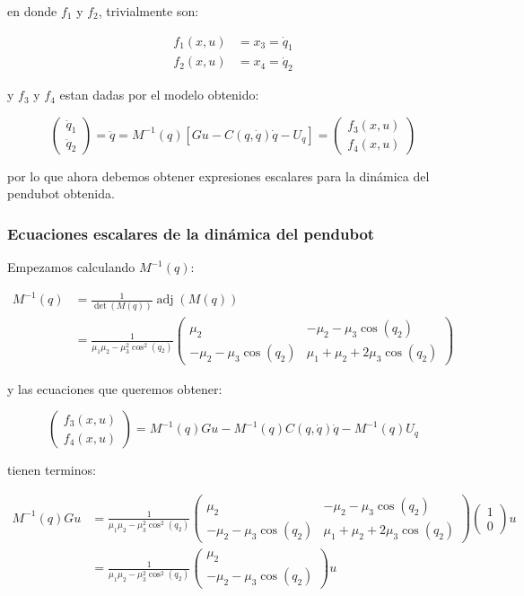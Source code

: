 \documentclass{article}
\DeclareMathOperator{\adjunta}{adj}
\begin{document}
en donde \(f_1\) y \(f_2\), trivialmente son:

\[
\begin{align}
f_1(x, u) &= x_3 = \dot{q}_1 \\
f_2(x, u) &= x_4 = \dot{q}_2
\end{align}
\]

y \(f_3\) y \(f_4\) estan dadas por el modelo obtenido:

\[
\begin{pmatrix}
\ddot{q}_1 \\
\ddot{q}_2
\end{pmatrix} = \ddot{q} = M^{-1}(q) \left[ G u - C(q, \dot{q}) \dot{q} - U_q \right] =
\begin{pmatrix}
f_3(x, u) \\
f_4(x, u)
\end{pmatrix}
\]

por lo que ahora debemos obtener expresiones escalares para la dinámica
del pendubot obtenida.

    \subsubsection*{Ecuaciones escalares de la dinámica del
pendubot}\label{ecuaciones-escalares-de-la-dinuxe1mica-del-pendubot}

Empezamos calculando \(M^{-1}(q)\):

\[
\begin{align}
M^{-1}(q) &= \frac{1}{\det{\left( M(q) \right)}} \adjunta{\left( M(q) \right)} \\
&= \frac{1}{\mu_1 \mu_2 - \mu_3^2 \cos^2{(q_2)}}
\begin{pmatrix}
\mu_2 & -\mu_2 - \mu_3 \cos{(q_2)} \\
-\mu_2 - \mu_3 \cos{(q_2)} & \mu_1 + \mu_2 + 2 \mu_3 \cos{(q_2)}
\end{pmatrix}
\end{align}
\]

y las ecuaciones que queremos obtener:

\[
\begin{pmatrix}
f_3(x, u) \\
f_4(x, u)
\end{pmatrix} = M^{-1}(q) G u - M^{-1}(q) C(q, \dot{q}) \dot{q} - M^{-1}(q) U_q
\]

tienen terminos:

\[
\begin{align}
M^{-1}(q) G u &= \frac{1}{\mu_1 \mu_2 - \mu_3^2 \cos^2{(q_2)}}
\begin{pmatrix}
\mu_2 & -\mu_2 - \mu_3 \cos{(q_2)} \\
-\mu_2 - \mu_3 \cos{(q_2)} & \mu_1 + \mu_2 + 2 \mu_3 \cos{(q_2)}
\end{pmatrix}
\begin{pmatrix}
1 \\
0
\end{pmatrix} u \\
&= \frac{1}{\mu_1 \mu_2 - \mu_3^2 \cos^2{(q_2)}}
\begin{pmatrix}
\mu_2 \\
-\mu_2 - \mu_3 \cos{(q_2)}
\end{pmatrix} u
\end{align}
\]
\end{document}
